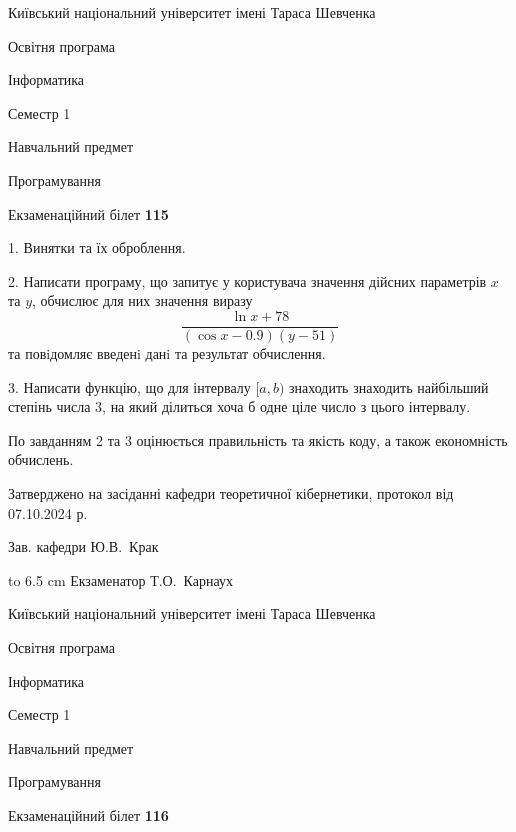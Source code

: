 \documentclass[12pt, ukrainian]{article}
\begin{document}
\newpage
{{\begin {scriptsize}\par
{ \center  Київський національний університет імені Тараса Шевченка \par}
{\parbox {5 cm}{Освітня програма \hfill}{\parbox {7 cm}{Інформатика\hfill}}\parbox {6 cm}{\hfill Семестр 1}}\par
{\parbox {5 cm} {Навчальний предмет \hfill}\parbox {7 cm}{Програмування \hfill}\parbox {6cm}{\hfill}\par}\vspace{-15pt} \end{scriptsize}}{\center Екзаменаційний білет \No \textbf { 115 }\par}}
{%
1. Винятки та їх оброблення.%
\par
2. Написати програму, що запитує у користувача значення дійсних параметрів $x$ та $y$, обчислює для них значення виразу 
$$\frac{\ln x + 78}{(\cos x - 0.9) (y - 51)}$$ 
та повiдомляє введенi данi та результат обчислення.

\par
3. Написати функцію, що для інтервалу $[a, b)$ знаходить знаходить найбільший степінь числа 3, на який ділиться хоча б одне ціле число з цього інтервалу.

По завданням 2 та 3 оцінюється правильність та якість коду, а також економність обчислень.

}
{\smallskip\smallskip \begin {scriptsize} Затверджено на засіданні кафедри теоретичної кібернетики, протокол   від   07.10.2024 р.\par\smallskip\smallskip\smallskip\smallskip
{\parbox {6.5 cm} {Зав. кафедри \dotfill Ю.В.~Крак}}\hspace {0.7cm} {\hbox to 6.5 cm { Екзаменатор \dotfill Т.О.~Карнаух}} \end{scriptsize}}
\vspace{0.9cm}
{{\begin {scriptsize}\par
{ \center  Київський національний університет імені Тараса Шевченка \par}
{\parbox {5 cm}{Освітня програма \hfill}{\parbox {7 cm}{Інформатика\hfill}}\parbox {6 cm}{\hfill Семестр 1}}\par
{\parbox {5 cm} {Навчальний предмет \hfill}\parbox {7 cm}{Програмування \hfill}\parbox {6cm}{\hfill}\par}\vspace{-15pt} \end{scriptsize}}{\center Екзаменаційний білет \No \textbf { 116 }\par}}
\end{document}
